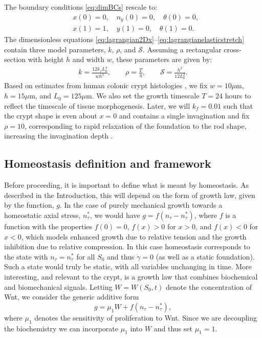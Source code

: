 The boundary conditions \eqref{eq:dimBCs} rescale to:
\begin{align}
&x(0) = 0, \quad n_y(0) = 0, \quad \theta(0) = 0,\nonumber\\
&x(1) = 1, \quad y(1) = 0, \quad \theta(1) = 0.\label{eq:lagrangianBCs}
\end{align}
The dimensionless equations \eqref{eq:lagrangian2Dx}--\eqref{eq:lagrangianelasticstretch} contain three model parameters, $k$, $\rho$, and $\mathcal{S}$. Assuming a rectangular cross-section with height $h$ and width $w$, these parameters are given by:
\begin{align}
k = \frac{12k_fL_0^4}{wh^3}, \qquad \rho = \frac{T}{\eta}, \qquad \mathcal{S} = \frac{h^2}{12L_0^2}.\label{eq:nondimparameters}
\end{align}
Based on estimates from human colonic crypt histologies \cite{taylor2003mitochondrial}, we fix $w = 10\mu$m, $h = 15\mu$m, and $L_0 = 125\mu$m. We also set the growth timescale $T = 24$ hours to reflect the timescale of tissue morphogenesis. Later, we will $k_f = 0.01$ such that the crypt shape is even about $x = 0$ and contains a single invagination and fix $\rho = 10$, corresponding to rapid relaxation of the foundation to the rod shape, increasing the invagination depth \cite{Almet2019b}.
\subsection{Homeostasis definition and framework}

Before proceeding, it is important to define what is meant by homeostasis. As described in the Introduction, this will depend on the form of growth law, given by the function, $g$. In the case of purely mechanical growth towards a homeostatic axial stress, $n_\tau^*$, we would have $g=f(n_\tau-n_\tau^*)$, where $f$ is a function with the properties $f(0)=0$, $f(x)>0$ for $x>0$, and $f(x)<0$ for $x<0$, which models enhanced growth due to relative tension and the growth inhibition due to relative compression. In this case homeostasis corresponds to the state with $n_\tau=n_\tau^*$ for all $S_0$ and thus $\dot\gamma=0$ (as well as a static foundation). Such a state would truly be static, with all variables unchanging in time. More interesting, and relevant to the crypt, is a growth law that combines biochemical and biomechanical signals. Letting $W=W(S_0,t)$ denote the concentration of Wnt, we consider the generic additive form 
\begin{equation}
g=\mu_1W+f(n_\tau-n_\tau^*),
\end{equation}
where $\mu_1$ denotes the sensitivity of proliferation to Wnt. Since we are decoupling the biochemistry we can incorporate $\mu_1$ into $W$ and thus set $\mu_1=1$. 

